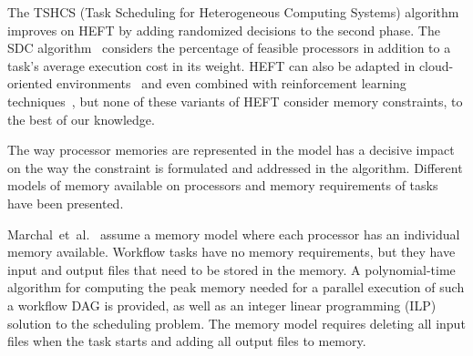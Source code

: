 \documentclass[conference]{IEEEtran}
\newcommand{\new}[1]{{\color{blue}#1}}
\begin{document}
The TSHCS (Task Scheduling for Heterogeneous Computing Systems) algorithm~\cite{alebrahim2017task} 
improves on HEFT by adding randomized decisions to the second phase.
The SDC algorithm~\cite{SHI2006665} considers the percentage of feasible processors in addition to a task’s
average execution cost in its weight.
HEFT  can also be adapted in cloud-oriented environments~\cite{samadi2018eheft} and even combined with reinforcement learning techniques~\cite{yano2022cqga}, but none of these variants of HEFT consider memory constraints, 
to the best of our knowledge. 

\medskip
{}
%
The way processor memories are represented in the model has a decisive impact on the way the constraint
is formulated and addressed in the algorithm.
%
Different models of memory available on processors and memory requirements of tasks have been presented.

Marchal~et~al.~\cite{marchal2018parallel} assume a memory model where each processor has an individual memory available.
Workflow tasks have no memory requirements, but they have input and output files that need to be stored in the memory.
A polynomial-time algorithm for computing the peak memory needed for a parallel execution of such a workflow DAG is provided,
as well as an integer linear programming (ILP) solution to the scheduling problem.
The memory model \new{requires deleting all input files when the task starts and adding all output files to memory.}
\end{document}
